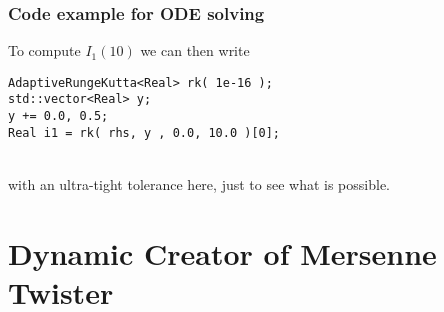 \documentclass{beamer}
\begin{document}
\begin{frame}[fragile]
\frametitle{Code example for ODE solving}
To compute $I_1(10)$ we can then write
\vspace{2mm}
\begin{verbatim}
AdaptiveRungeKutta<Real> rk( 1e-16 );
std::vector<Real> y;
y += 0.0, 0.5;
Real i1 = rk( rhs, y , 0.0, 10.0 )[0];
\end{verbatim}
\\
\vspace{2mm}
with an ultra-tight tolerance here, just to see what is possible.
\end{frame}






\section{Dynamic Creator of Mersenne Twister}
\end{document}
